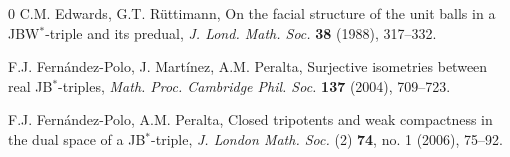 \documentclass[10pt]{amsart}
\begin{document}
\begin{thebibliography}{0}
		 C.M. Edwards, G.T. R\"{u}ttimann, On the facial structure of the unit balls in a JBW$^*$-triple and its predual, \emph{J. Lond. Math. Soc.} \textbf{38} (1988), 317--332.
		
		
		 F.J. Fern\'{a}ndez-Polo, J. Mart{\'i}nez, A.M. Peralta, Surjective isometries between real JB$^*$-triples, \emph{Math. Proc. Cambridge Phil. Soc.} \textbf{137} (2004), 709--723.	
		
		
		 F.J. Fern\'{a}ndez-Polo, A.M. Peralta, Closed tripotents and weak compactness in the dual space of a JB$^*$-triple, \emph{J. London Math. Soc.} (2) \textbf{74}, no. 1 (2006), 75--92.
		
		
		
		
		
		
		
		

\end{thebibliography}
\end{document}
